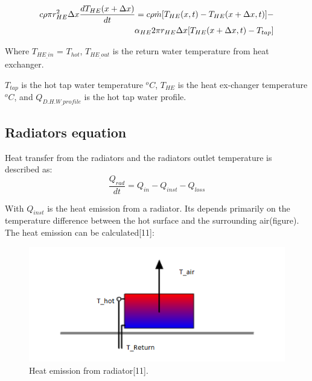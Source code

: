 \documentclass[a4paper,10pt]{article}
\begin{document}

\begin{align}
    c\rho\pi r_{HE}^2\Delta x\frac{dT_{HE}(x+\Delta x)}{dt}=c\rho\Dot{m}[T_{HE}(x,t)-T_{HE}(x+\Delta x,t)]-\notag\\
    \alpha_{HE}2\pi r_{HE}\Delta x[T_{HE}(x+\Delta x,t)- T_{tap}]
\end{align}

Where $T_{HE_{\_}in}$ = $T_{hot}$, $T_{HE_{\_}out}$ is the return water temperature from heat exchanger.

$T_{tap}$ is the hot tap water temperature $^oC$, $T_{HE}$ is the heat ex-changer temperature $^oC$, and $Q_{D.H.W_{\_}profile}$  is the hot tap water profile.



\subsection{Radiators equation}
Heat transfer from the radiators and the radiators outlet temperature is described as:
\begin{equation}
\frac{Q_{rad}}{dt}= Q_{in} -Q_{inst} - Q_{loss}
\end{equation}

With $Q_{inst}$ is the heat emission from a radiator. Its depends primarily on the temperature difference between the hot surface and the surrounding air(figure). The heat emission can be calculated[11]: 

\begin{figure}[ht]
\centering
\includegraphics[width=1\columnwidth]{heat_emission_radiator.png}
\caption[Short title]{Heat emission from radiator[11].}
\label{fig:ff2}\end{figure}
\end{document}
